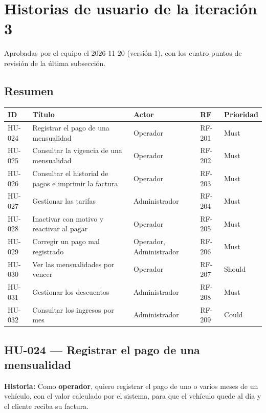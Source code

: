 \section{Historias de usuario de la iteración 3}
Aprobadas por el equipo el 2026-11-20 (versión 1), con los cuatro puntos de revisión de la última subsección.

\subsection{Resumen}

\begin{longtable}{>{\raggedright\arraybackslash}p{1.5cm}>{\raggedright\arraybackslash}p{7.0cm}>{\raggedright\arraybackslash}p{2.6cm}>{\raggedright\arraybackslash}p{1.5cm}>{\raggedright\arraybackslash}p{1.8cm}}
\toprule
\textbf{ID} & \textbf{Título} & \textbf{Actor} & \textbf{RF} & \textbf{Prioridad}\\
\midrule\endhead
HU-024 & Registrar el pago de una mensualidad & Operador & RF-201 & Must\\
HU-025 & Consultar la vigencia de una mensualidad & Operador & RF-202 & Must\\
HU-026 & Consultar el historial de pagos e imprimir la factura & Operador & RF-203 & Must\\
HU-027 & Gestionar las tarifas & Administrador & RF-204 & Must\\
HU-028 & Inactivar con motivo y reactivar al pagar & Operador & RF-205 & Must\\
HU-029 & Corregir un pago mal registrado & Operador, Administrador & RF-206 & Must\\
HU-030 & Ver las mensualidades por vencer & Operador & RF-207 & Should\\
HU-031 & Gestionar los descuentos & Administrador & RF-208 & Must\\
HU-032 & Consultar los ingresos por mes & Administrador & RF-209 & Could\\
\bottomrule
\end{longtable}




\subsection{HU-024 — Registrar el pago de una mensualidad}

\textbf{Historia:} Como \textbf{operador}, quiero registrar el pago de uno o varios meses de un vehículo, con el valor calculado por el sistema, para que el vehículo quede al día y el cliente reciba su factura.


